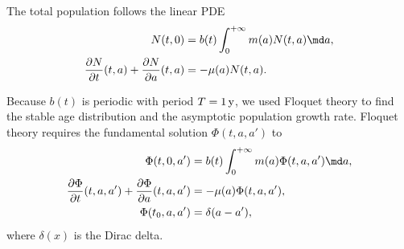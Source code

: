 \documentclass{jpmarticle}
\begin{document}
The total population follows the linear PDE
\begin{equation}
  \begin{split}
    N(t, 0)
    &= b(t) \int_0^{+\infty} m(a) N(t, a) \md a,
    \\
    \frac{\partial N}{\partial t}(t, a)
    + \frac{\partial N}{\partial a}(t, a)
    &= - \mu(a) N(t, a).
  \end{split}
\end{equation}

Because $b(t)$ is periodic with period $T = \unit[1]{y}$, we used
Floquet theory \autocite{parker_1992} to find the stable age
distribution and the asymptotic population growth rate. Floquet theory
requires the fundamental solution $\Phi(t, a, a')$ to
\begin{equation}
  \begin{split}
    \Phi(t, 0, a')
    &= b(t) \int_0^{+\infty} m(a) \Phi(t, a, a') \md a,
    \\
    \frac{\partial \Phi}{\partial t}(t, a, a')
    + \frac{\partial \Phi}{\partial a}(t, a, a')
    &= - \mu(a) \Phi(t, a, a'),
    \\
    \Phi(t_0, a, a')
    &= \delta(a - a'),
  \end{split}
\end{equation}
where $\delta(x)$ is the Dirac delta.
\end{document}
